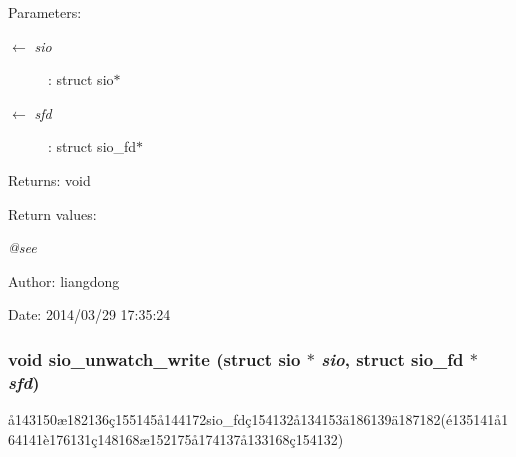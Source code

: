 \begin{Desc}
\item[Parameters:]
\begin{description}
\item[\mbox{$\leftarrow$} {\em sio}]: struct sio$\ast$ \item[\mbox{$\leftarrow$} {\em sfd}]: struct sio\_\-fd$\ast$ \end{description}
\end{Desc}
\begin{Desc}
\item[Returns:]void \end{Desc}
\begin{Desc}
\item[Return values:]
\begin{description}
\item[{\em @see}]\end{description}
\end{Desc}
\begin{Desc}
\item[Author:]liangdong \end{Desc}
\begin{Desc}
\item[Date:]2014/03/29 17:35:24 \end{Desc}
\subsubsection{\setlength{\rightskip}{0pt plus 5cm}void sio\_\-unwatch\_\-write (struct sio $\ast$ {\em sio}, struct sio\_\-fd $\ast$ {\em sfd})}\label{sio_8c_a8}


\aa{}143150\ae{}182136\c{c}155145\aa{}144172sio\_\-fd\c{c}154132\aa{}134153\"{a}186139\"{a}187182(\'{e}135141\aa{}164141\`{e}176131\c{c}148168\ae{}152175\aa{}174137\aa{}133168\c{c}154132) 

